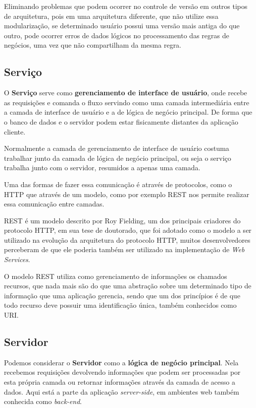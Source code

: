 \documentclass[
	12pt,				%
	openright,			%
	twoside,			%
	a4paper,			%
	english,			%
	brazil				%
	]{abntex2}
\begin{document}
Eliminando problemas que podem ocorrer no controle de versão em outros tipos de arquitetura, pois em uma arquitetura diferente, que não utilize essa modularização, se determinado usuário possui uma versão mais antiga do que outro, pode ocorrer erros de dados lógicos no processamento das regras de negócios, uma vez que não compartilham da mesma regra.

\subsection{Serviço}
\label{subsec:Servico}

O \textbf{Serviço} serve como \textbf{gerenciamento de interface de usuário}, onde recebe as requisições e comanda o fluxo servindo como uma camada intermediária entre a camada de interface de usuário e a de lógica de negócio principal. De forma que o banco de dados e o servidor podem estar fisicamente distantes da aplicação cliente.

Normalmente a camada de gerenciamento de interface de usuário costuma trabalhar junto da camada de lógica de negócio principal, ou seja o serviço trabalha junto com o servidor, resumidos a apenas uma camada.

Uma das formas de fazer essa comunicação é através de protocolos, como o HTTP que através de um modelo, como por exemplo REST nos permite realizar essa comunicação entre camadas.

REST é um modelo descrito por Roy Fielding, um dos principais criadores do protocolo HTTP, em sua tese de doutorado, que foi adotado como o modelo a ser utilizado na evolução da arquitetura do protocolo HTTP, muitos desenvolvedores perceberam de que ele poderia também ser utilizado na implementação de \textit{Web Services}.

O modelo REST utiliza como gerenciamento de informações os chamados recursos, que nada mais são do que uma abstração sobre um determinado tipo de informação que uma aplicação gerencia, sendo que um dos princípios é de que todo recurso deve possuir uma identificação única, também conhecidos como URI.

\subsection{Servidor}
\label{subsec:Servidor}

Podemos considerar o \textbf{Servidor} como a \textbf{lógica de negócio principal}. Nela recebemos requisições devolvendo informações que podem ser processadas por esta própria camada ou retornar informações através da camada de acesso a dados. Aqui está a parte da aplicação \textit{server-side}, em ambientes web também conhecida como \textit{back-end}.
\end{document}
